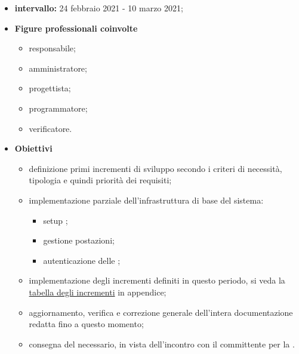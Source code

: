                 \begin{itemize}
                    \item \textbf{intervallo: }24 febbraio 2021 - 10 marzo 2021;
                
                \item  \textbf{Figure professionali coinvolte}
                    \begin{itemize}
                        \item responsabile;
                        \item amministratore;
                        \item progettista;
                        \item programmatore;
                        \item verificatore.
                    \end{itemize}
        
                    \item \textbf{Obiettivi}

                                \begin{itemize}
                                    \item definizione primi incrementi di sviluppo secondo i criteri di necessità, tipologia e quindi priorità dei requisiti;
                                    \item implementazione parziale dell'infrastruttura di base del sistema:
                                            \begin{itemize}
                                                \item setup ;
                                                \item {} gestione postazioni;
                                                \item autenticazione delle ;
                                            \end{itemize}                            
                                    \item implementazione degli incrementi definiti in questo periodo, si veda la\hypersetup{
                                        linkcolor=blue
                                    }
                                    \hyperlink{TabellaIncrementi}{tabella degli incrementi} in appendice;
                                    \hypersetup{
                                        linkcolor=black
                                    }
                                    
                                    \item aggiornamento, verifica e correzione generale dell'intera documentazione redatta fino a questo momento;
                                    \item consegna del  necessario, in vista dell'incontro con il committente per la \RP{}.
                                \end{itemize}
                    \end{itemize}
            
